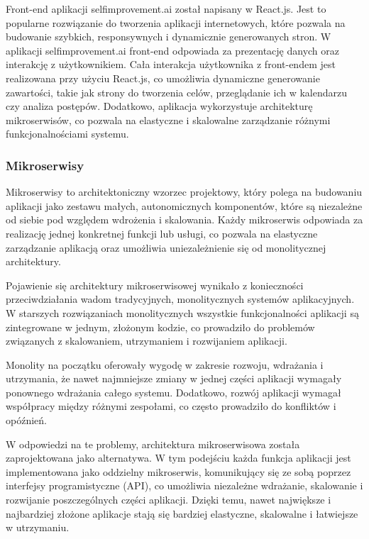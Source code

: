 Front-end aplikacji selfimprovement.ai został napisany w React.js. Jest to popularne rozwiązanie do tworzenia aplikacji internetowych, które pozwala na budowanie szybkich, responsywnych i dynamicznie generowanych stron. W aplikacji selfimprovement.ai front-end odpowiada za prezentację danych oraz interakcję z użytkownikiem. Cała interakcja użytkownika z front-endem jest realizowana przy użyciu React.js, co umożliwia dynamiczne generowanie zawartości, takie jak strony do tworzenia celów, przeglądanie ich w kalendarzu czy analiza postępów. Dodatkowo, aplikacja wykorzystuje architekturę mikroserwisów, co pozwala na elastyczne i skalowalne zarządzanie różnymi funkcjonalnościami systemu.

\subsubsection{Mikroserwisy}

Mikroserwisy to architektoniczny wzorzec projektowy, który polega na budowaniu aplikacji jako zestawu małych, autonomicznych komponentów, które są niezależne od siebie pod względem wdrożenia i skalowania. Każdy mikroserwis odpowiada za realizację jednej konkretnej funkcji lub usługi, co pozwala na elastyczne zarządzanie aplikacją oraz umożliwia uniezależnienie się od monolitycznej architektury.

Pojawienie się architektury mikroserwisowej wynikało z konieczności przeciwdziałania wadom tradycyjnych, monolitycznych systemów aplikacyjnych. W starszych rozwiązaniach monolitycznych wszystkie funkcjonalności aplikacji są zintegrowane w jednym, złożonym kodzie, co prowadziło do problemów związanych z skalowaniem, utrzymaniem i rozwijaniem aplikacji.

Monolity na początku oferowały wygodę w zakresie rozwoju, wdrażania i utrzymania, że nawet najmniejsze zmiany w jednej części aplikacji wymagały ponownego wdrażania całego systemu. Dodatkowo, rozwój aplikacji wymagał współpracy między różnymi zespołami, co często prowadziło do konfliktów i opóźnień.

W odpowiedzi na te problemy, architektura mikroserwisowa została zaprojektowana jako alternatywa. W tym podejściu każda funkcja aplikacji jest implementowana jako oddzielny mikroserwis, komunikujący się ze sobą poprzez interfejsy programistyczne (API), co umożliwia niezależne wdrażanie, skalowanie i rozwijanie poszczególnych części aplikacji. Dzięki temu, nawet największe i najbardziej złożone aplikacje stają się bardziej elastyczne, skalowalne i łatwiejsze w utrzymaniu.

